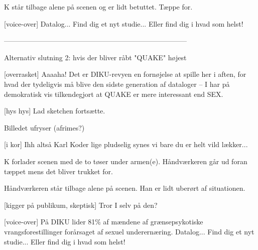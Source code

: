 \documentclass[danish]{article}
\begin{document}
\begin{sketch}
\scene K står tilbage alene på scenen og er lidt betuttet. Tæppe for.

[voice-over] Datalog... Find dig et nyt studie... Eller find dig i
hvad som helst!

\scene ------------------------------------------------------------------------------

\scene Alternativ slutning 2: hvis der bliver råbt "QUAKE" højest

[overrasket] Aaaaha! Det er DIKU-revyen en fornøjelse at spille her
i aften, for hvad der tydeligvis må blive den sidste generation af
dataloger -- I har på demokratisk vis tilkendegjort at QUAKE er mere
interessant end SEX.

[hys hys] Lad sketchen fortsætte.

\scene Billedet ufryser (afrimes?)

[i kor] Ihh altså Karl Koder lige pludselig synes vi bare du er
helt vild lækker...

\scene K forlader scenen med de to tøser under armen(e). Håndværkeren går ud
foran tæppet mens det bliver trukket for.

\scene Håndværkeren står tilbage alene på scenen. Han er lidt uberørt af
situationen.

[kigger på publikum, skeptisk] Tror I selv på den? 

[voice-over] På DIKU lider 81\% af mændene af grænsepsykotiske
vrangsforestillinger forårsaget af sexuel underernæring.  Datalog...
Find dig et nyt studie... Eller find dig i hvad som helst!

\end{sketch}
\end{document}
